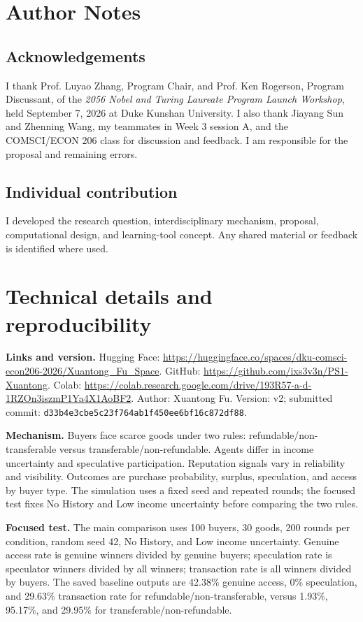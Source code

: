 \clearpage\nobalance
\section*{Author Notes}
\subsection*{Acknowledgements}
I thank Prof. Luyao Zhang, Program Chair, and Prof. Ken Rogerson, Program Discussant, of the \emph{2056 Nobel and Turing Laureate Program Launch Workshop}, held September 7, 2026 at Duke Kunshan University. I also thank Jiayang Sun and Zhenning Wang, my teammates in Week 3 session A, and the COMSCI/ECON 206 class for discussion and feedback. I am responsible for the proposal and remaining errors.
\subsection*{Individual contribution}
I developed the research question, interdisciplinary mechanism, proposal, computational design, and learning-tool concept. Any shared material or feedback is identified where used.




\appendix
\section{Technical details and reproducibility}
\textbf{Links and version.}
Hugging Face: \url{https://huggingface.co/spaces/dku-comsci-econ206-2026/Xuantong_Fu_Space}.
GitHub: \url{https://github.com/ixs3v3n/PS1-Xuantong}.
Colab: \url{https://colab.research.google.com/drive/193R57-a-d-1RZOn3iszmP1Ya4X1AoBF2}.
Author: Xuantong Fu.
Version: v2; submitted commit: \texttt{d33b4e3cbe5c23f764ab1f450ee6bf16c872df88}.

\textbf{Mechanism.} Buyers face scarce goods under two rules: refundable/non-transferable versus transferable/non-refundable. Agents differ in income uncertainty and speculative participation. Reputation signals vary in reliability and visibility. Outcomes are purchase probability, surplus, speculation, and access by buyer type. The simulation uses a fixed seed and repeated rounds; the focused test fixes No History and Low income uncertainty before comparing the two rules.

\textbf{Focused test.} The main comparison uses 100 buyers, 30 goods, 200 rounds per condition, random seed 42, No History, and Low income uncertainty. Genuine access rate is genuine winners divided by genuine buyers; speculation rate is speculator winners divided by all winners; transaction rate is all winners divided by buyers. The saved baseline outputs are 42.38\% genuine access, 0\% speculation, and 29.63\% transaction rate for refundable/non-transferable, versus 1.93\%, 95.17\%, and 29.95\% for transferable/non-refundable.

